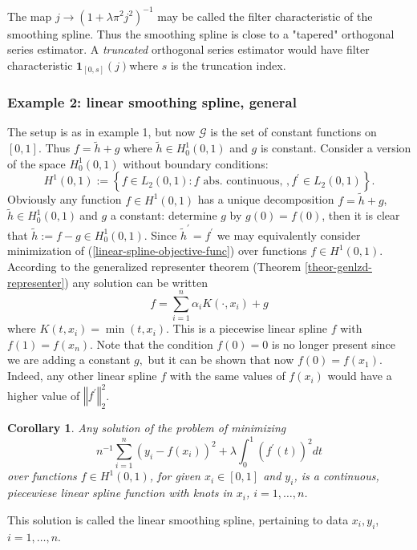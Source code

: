 \documentclass[11pt,twoside]{article}%
\theoremstyle{change}
\newtheorem{corollary}[theorem]{Corollary}
\begin{document}
The map $j\rightarrow\left(  1+\lambda\pi^{2}j^{2}\right)  ^{-1}$ may be
called the filter characteristic of the smoothing spline. Thus the smoothing
spline is close to a "tapered" orthogonal series estimator. A
\textit{truncated }orthogonal series estimator would have filter
characteristic $\mathbf{1}_{[0,s]}(j)$where $s$ is the truncation index.
\bigskip\bigskip

\subsubsection{Example 2: linear smoothing spline, general}

The setup is as in example 1, but now $\mathcal{G}$ is the set of constant
functions on $[0,1]$. Thus $f=\tilde{h}+g$ where $\tilde{h}\in H_{0}^{1}(0,1)
$ and $g$ is constant. Consider a version of the space $H_{0}^{1}(0,1)$
without boundary conditions:
\[
H^{1}(0,1):=\left\{  f\in L_{2}(0,1):f\text{ abs. continuous, },f^{\prime}\in
L_{2}(0,1)\right\}  .
\]
Obviously any function $f\in H^{1}(0,1)$ has a unique decomposition
$f=\tilde{h}+g$, $\tilde{h}\in H_{0}^{1}(0,1)\mathcal{\ }$and $g$ a constant:
determine $g$ by $g(0)=f(0)$, then it is clear that $\tilde{h}:=f-g\in
H_{0}^{1}(0,1)$. Since $\tilde{h}^{\prime}=f^{\prime}$ we may equivalently
consider minimization of (\ref{linear-spline-objective-func}) over functions
$f\in H^{1}(0,1)$. According to the generalized representer theorem (Theorem
\ref{theor-genlzd-representer}) any solution can be written
\[
f=\sum_{i=1}^{n}\alpha_{i}K\left(  \cdot,x_{i}\right)  +g
\]
where $K\left(  t,x_{i}\right)  =\min\left(  t,x_{i}\right)  $. This is a
piecewise linear spline $f$ with $f(1)=f(x_{n}).$ Note that the condition
$f(0)=0$ is no longer present since we are adding a constant $g,$ but it can
be shown that now $f(0)=f(x_{1})$. Indeed, any other linear spline $f$ with
the same values of $f(x_{i})$ would have a higher value of $\left\Vert
f^{\prime}\right\Vert _{2}^{2}$.

\begin{corollary}
\label{coroll-lin-spline-general}Any solution of the problem of minimizing
\[
n^{-1}\sum_{i=1}^{n}(y_{i}-f(x_{i}))^{2}+\lambda\int_{0}^{1}\left(  f^{\prime
}(t)\right)  ^{2}dt
\]
over functions $f\in H^{1}(0,1)$, for given $x_{i}\in\left[  0,1\right]  $ and
$y_{i}$, is a continuous, piecewiese linear spline function with knots in
$x_{i}$, $i=1,\ldots,n$.
\end{corollary}

This solution is called the linear smoothing spline, pertaining to data
$x_{i},y_{i}$, $i=1,\ldots,n$.
\end{document}

